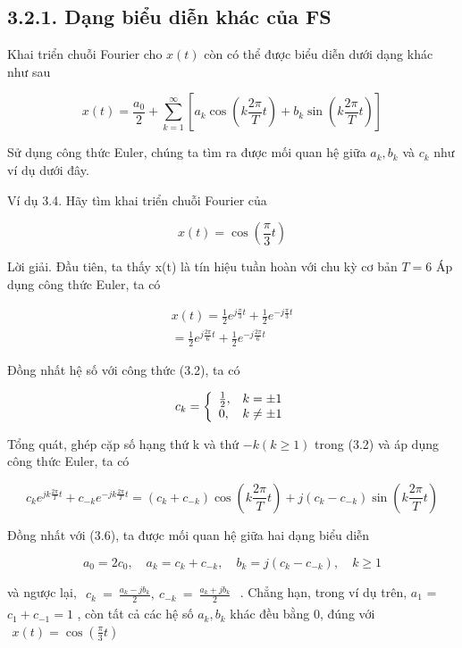 \documentclass[
  10
]{article}
\begin{document}
\subsection{3.2.1. Dạng biểu diễn khác của
FS}\label{dux1ea1ng-biux1ec3u-diux1ec5n-khuxe1c-cux1ee7a-fs}

Khai triển chuỗi Fourier cho \(x ( t )\) còn có thể được biểu diễn dưới
dạng khác như sau

\[
x (t) = \frac {a _ {0}}{2} + \sum_ {k = 1} ^ {\infty} [ a _ {k} \cos (k \frac {2 \pi}{T} t) + b _ {k} \sin (k \frac {2 \pi}{T} t) ]\tag{3.6}
\]

Sử dụng công thức Euler, chúng ta tìm ra được mối quan hệ giữa
\(a _ { k } , b _ { k }\) và \(c _ { k }\) như ví dụ dưới đây.

Ví dụ 3.4. Hãy tìm khai triển chuỗi Fourier của

\[
x (t) = \cos (\frac {\pi}{3} t)
\]

Lời giải. Đầu tiên, ta thấy x(t) là tín hiệu tuần hoàn với chu kỳ cơ bản
\(T = 6\) Áp dụng công thức Euler, ta có

\[
\begin{array}{c} x (t) = \frac {1}{2} e ^ {j \frac {\pi}{3} t} + \frac {1}{2} e ^ {- j \frac {\pi}{3} t} \\ = \frac {1}{2} e ^ {j \frac {2 \pi}{6} t} + \frac {1}{2} e ^ {- j \frac {2 \pi}{6} t} \end{array}
\]

Đồng nhất hệ số với công thức (3.2), ta có

\[
c _ {k} = \left\{ \begin{array}{l l} \frac {1}{2}, & k = \pm 1 \\ 0, & k \neq \pm 1 \end{array} \right.
\]

Tổng quát, ghép cặp số hạng thứ k và thứ \(- k \left( k \geq 1 \right)\)
trong (3.2) và áp dụng công thức Euler, ta có

\[
c _ {k} e ^ {j k \frac {2 \pi}{T} t} + c _ {- k} e ^ {- j k \frac {2 \pi}{T} t} = (c _ {k} + c _ {- k}) \cos (k \frac {2 \pi}{T} t) + j (c _ {k} - c _ {- k}) \sin (k \frac {2 \pi}{T} t)
\]

Đồng nhất với (3.6), ta được mối quan hệ giữa hai dạng biểu diễn

\[
a _ {0} = 2 c _ {0}, \quad a _ {k} = c _ {k} + c _ {- k}, \quad b _ {k} = j (c _ {k} - c _ {- k}), \quad k \geq 1
\]

và ngược lại,
\(\begin{array} { l } { { c _ { k } ~ = ~ \frac { a _ { k } - j b _ { k } } { 2 } , ~ c _ { - k } ~ = ~ \frac { a _ { k } + j b _ { k } } { 2 } } } \end{array}\)
. Chẳng hạn, trong ví dụ trên, \(a _ { 1 }\) =
\(c _ { 1 } + c _ { - 1 } = 1\) , còn tất cả các hệ số
\(a _ { k } , b _ { k }\) khác đều bằng 0, đúng với
\(\begin{array} { r } { x ( t ) = \cos ( \frac { \pi } { 3 } t ) } \end{array}\)
\end{document}
